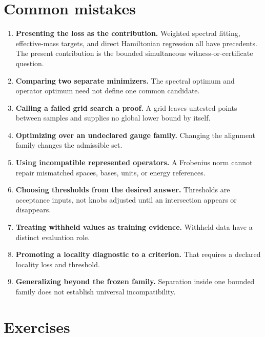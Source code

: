 \section{Common mistakes}

\begin{enumerate}
  \item \textbf{Presenting the loss as the contribution.} Weighted spectral
        fitting, effective-mass targets, and direct Hamiltonian regression all
        have precedents. The present contribution is the bounded simultaneous
        witness-or-certificate question.
  \item \textbf{Comparing two separate minimizers.} The spectral optimum and
        operator optimum need not define one common candidate.
  \item \textbf{Calling a failed grid search a proof.} A grid leaves untested
        points between samples and supplies no global lower bound by itself.
  \item \textbf{Optimizing over an undeclared gauge family.} Changing the
        alignment family changes the admissible set.
  \item \textbf{Using incompatible represented operators.} A Frobenius norm
        cannot repair mismatched spaces, bases, units, or energy references.
  \item \textbf{Choosing thresholds from the desired answer.} Thresholds are
        acceptance inputs, not knobs adjusted until an intersection appears or
        disappears.
  \item \textbf{Treating withheld values as training evidence.} Withheld data
        have a distinct evaluation role.
  \item \textbf{Promoting a locality diagnostic to a criterion.} That requires
        a declared locality loss and threshold.
  \item \textbf{Generalizing beyond the frozen family.} Separation inside one
        bounded family does not establish universal incompatibility.
\end{enumerate}

\section{Exercises}

